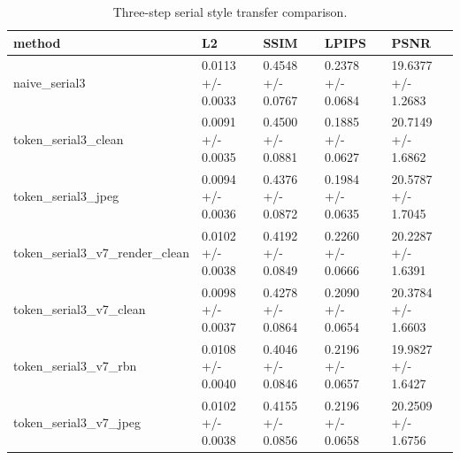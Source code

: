\begin{table}
\caption{Three-step serial style transfer comparison.}
\label{tab:serial3}
\begin{tabular}{lllll}
\toprule
method & L2 & SSIM & LPIPS & PSNR \\
\midrule
naive_serial3 & 0.0113 +/- 0.0033 & 0.4548 +/- 0.0767 & 0.2378 +/- 0.0684 & 19.6377 +/- 1.2683 \\
token_serial3_clean & 0.0091 +/- 0.0035 & 0.4500 +/- 0.0881 & 0.1885 +/- 0.0627 & 20.7149 +/- 1.6862 \\
token_serial3_jpeg & 0.0094 +/- 0.0036 & 0.4376 +/- 0.0872 & 0.1984 +/- 0.0635 & 20.5787 +/- 1.7045 \\
token_serial3_v7_render_clean & 0.0102 +/- 0.0038 & 0.4192 +/- 0.0849 & 0.2260 +/- 0.0666 & 20.2287 +/- 1.6391 \\
token_serial3_v7_clean & 0.0098 +/- 0.0037 & 0.4278 +/- 0.0864 & 0.2090 +/- 0.0654 & 20.3784 +/- 1.6603 \\
token_serial3_v7_rbn & 0.0108 +/- 0.0040 & 0.4046 +/- 0.0846 & 0.2196 +/- 0.0657 & 19.9827 +/- 1.6427 \\
token_serial3_v7_jpeg & 0.0102 +/- 0.0038 & 0.4155 +/- 0.0856 & 0.2196 +/- 0.0658 & 20.2509 +/- 1.6756 \\
\bottomrule
\end{tabular}
\end{table}
